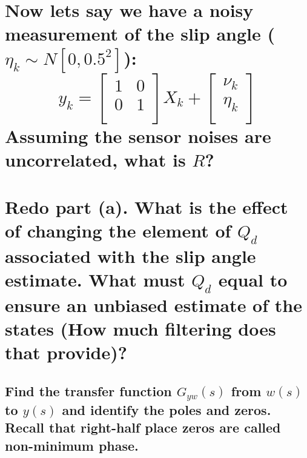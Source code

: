 \documentclass[12pt,letterpaper, onecolumn]{exam}
\begin{document}
\begin{questions}
\begin{parts}
        \part{Now lets say we have a noisy measurement of the slip angle ($\eta_k \sim N\left[0,0.5^2\right]$):
            \[
                y_k =
                \begin{bmatrix}
                    1 & 0 \\
                    0 & 1 \\
                \end{bmatrix} X_k +
                \begin{bmatrix}
                    \nu_k  \\
                    \eta_k \\
                \end{bmatrix}
            \]
            Assuming the sensor noises are uncorrelated, what is $R$?}

        \part{Redo part (a). What is the effect of changing the element of $Q_d$ associated with the slip angle estimate. What must $Q_d$ equal to ensure an unbiased estimate of the states (How much filtering does that provide)?}

    \end{parts}
    \clearpage
    \begin{parts}
        \part{Find the transfer function $G_{yw}(s)$ from $w(s)$ to $y(s)$ and identify the poles and zeros. Recall that right-half place zeros are called non-minimum phase.}


\end{parts}
\end{questions}
\end{document}
